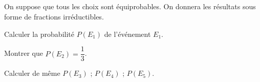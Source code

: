 \subsection{}

On suppose que tous les choix sont équiprobables. On donnera les résultats sous forme de fractions irréductibles.

\begin{questions}
	\question[1] Calculer la probabilité $P(E_1)$ de l'événement $E_1$.
	
	\question[1] Montrer que $P(E_2)=\dfrac{1}{3}$.
	
	\question[2] Calculer de même $P(E_3)$ ; $P(E_4)$ ; $P(E_5)$.
\end{questions} 